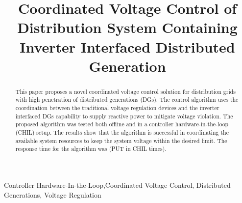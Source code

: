 \documentclass[Journal]{IEEEtran}
\begin{document}
\title{Coordinated Voltage Control of Distribution System Containing Inverter Interfaced Distributed Generation}

\author{
}





\maketitle

\begin{abstract}
    This paper proposes a novel coordinated voltage control solution for distribution grids with high penetration of distributed generations (DGs). The control algorithm uses the coordination between the traditional voltage regulation devices and the inverter interfaced DGs capability to supply reactive power to mitigate voltage violation. The proposed algorithm was tested both offline and in a controller hardware-in-the-loop (CHIL) setup. The results show that the algorithm is successful in coordinating the available system resources to keep the system voltage within the desired limit. The response time for the algorithm was (PUT in CHIL times).
\end{abstract}


\begin{IEEEkeywords}
Controller Hardware-In-the-Loop,Coordinated Voltage Control, Distributed Generations, Voltage Regulation
\end{IEEEkeywords}
\end{document}
